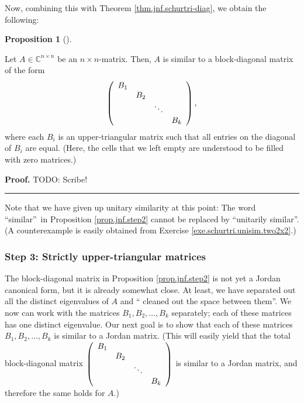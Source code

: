 \documentclass[numbers=enddot,12pt,final,onecolumn,notitlepage]{scrartcl}%
\numberwithin{exer}{subsection}
\theoremstyle{definition}
\newtheorem{prop}[theo]{Proposition}
\newenvironment{proposition}[1][]
{\begin{prop}[#1]\begin{leftbar}}
{\end{leftbar}\end{prop}}
\newenvironment{proof}[1][Proof]{\noindent\textbf{#1.} }{\ \rule{0.5em}{0.5em}}
\begin{document}
Now, combining this with Theorem \ref{thm.jnf.schurtri-diag}, we obtain the following:

\begin{proposition}
\label{prop.jnf.step2}Let $A\in\mathbb{C}^{n\times n}$ be an $n\times
n$-matrix. Then, $A$ is similar to a block-diagonal matrix of the form%
\[
\left(
\begin{array}
[c]{cccc}%
B_{1} &  &  & \\
& B_{2} &  & \\
&  & \ddots & \\
&  &  & B_{k}%
\end{array}
\right)  ,
\]
where each $B_{i}$ is an upper-triangular matrix such that all entries on the
diagonal of $B_{i}$ are equal. (Here, the cells that we left empty are
understood to be filled with zero matrices.)
\end{proposition}

\begin{proof}
TODO: Scribe!
\end{proof}

Note that we have given up unitary similarity at this point: The word
\textquotedblleft similar\textquotedblright\ in Proposition
\ref{prop.jnf.step2} cannot be replaced by \textquotedblleft unitarily
similar\textquotedblright. (A counterexample is easily obtained from Exercise
\ref{exe.schurtri.unisim.two2x2}.)

\subsubsection{\label{subsect.jnf.exist.step3}Step 3: Strictly
upper-triangular matrices}

The block-diagonal matrix in Proposition \ref{prop.jnf.step2} is not yet a
Jordan canonical form, but it is already somewhat close. At least, we have
separated out all the distinct eigenvalues of $A$ and \textquotedblleft
cleaned out the space between them\textquotedblright. We now can work with the
matrices $B_{1},B_{2},\ldots,B_{k}$ separately; each of these matrices has one
distinct eigenvalue. Our next goal is to show that each of these matrices
$B_{1},B_{2},\ldots,B_{k}$ is similar to a Jordan matrix. (This will easily
yield that the total block-diagonal matrix $\left(
\begin{array}
[c]{cccc}%
B_{1} &  &  & \\
& B_{2} &  & \\
&  & \ddots & \\
&  &  & B_{k}%
\end{array}
\right)  $ is similar to a Jordan matrix, and therefore the same holds for $A$.)
\end{document}
